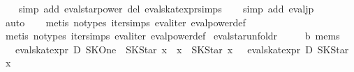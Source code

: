 \begin{isabellebody}
%
\isadelimproof
\ \ %
\endisadelimproof
%
\isatagproof
{}\isamarkupfalse%
\ {}simp\ add{}\ eval{}star{}power\ del{}\ eval{}skat{}expr{}simps{}{}{}{}\isanewline
\ \ \isamarkupfalse%
\ {}simp\ add{}\ eval{}jp{}\isanewline
\ \ \isamarkupfalse%
\ auto\isanewline
\ \ \isamarkupfalse%
\ {}metis\ {}no{}types{}\ iter{}simps{}{}{}\ eval{}iter\ eval{}power{}def{}\isanewline
\ \ \isamarkupfalse%
\ {}metis\ {}no{}types{}\ iter{}simps{}{}{}\ eval{}iter\ eval{}power{}def{}%
\endisatagproof
{\isafoldproof}%
%
\isadelimproof
\isanewline
%
\endisadelimproof
\isanewline
{}\isamarkupfalse%
\ eval{}star{}unfoldr{}\isanewline
\ \ \ {}\ {}{}\ {}{}b\ mems{}\isanewline
\ \ \ {}eval{}skat{}expr\ D\ {}SKOne\ {}{}{}\ SKStar\ x\ {}{}{}\ x\ {}{}{}\ SKStar\ x{}\ {}\ {}\ eval{}skat{}expr\ D\ {}SKStar\ x{}\ {}{}\isanewline

\end{isabellebody}
